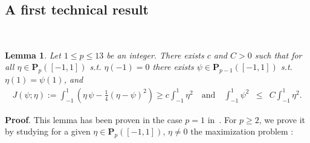 \documentclass[final]{siamltex}
\newtheorem{lem}{Lemma}
\begin{document}
\subsection{A first technical result}
\noindent\\
\vspace{-2mm}
\begin{lem}\label{lem:etapsi_base}
Let $1 \le p\le 13$ be an integer. There exists $c$ and $C>0$ such that for all
$\eta\in {\mathbf{P}}_p([-1,1])$ s.t.
$\eta(-1)=0$ there exists $\psi\in{\mathbf{P}}_{p-1}([-1,1])$ s.t.
$\eta(1)=\psi(1)$, and
\begin{eqnarray*}
J(\psi;\eta):=\int_{-1}^1 (\eta\,\psi -\frac{1}{4}(\eta-\psi)^2)
\ge  c \int_{-1}^1 \eta^2 \quad \text{and} \quad 
\int_{-1}^1 \psi^2 &\le& C \int_{-1}^1 \eta^2.
\end{eqnarray*}
\end{lem}
{\bf Proof}. This lemma has been proven in the case $p=1$ in~\cite{JMN10}.
For $p \ge 2$, we prove it by studying for a given $\eta\in {\mathbf{P}}_p([-1,1])$,
$\eta\neq 0$ the maximization problem : \\
\end{document}
